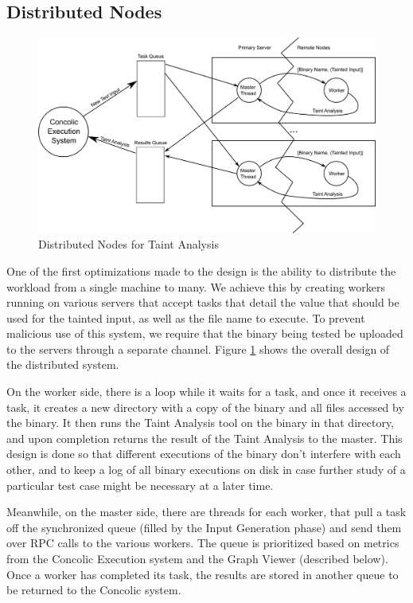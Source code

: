 \subsection{Distributed Nodes}
\begin{figure}[ht]
 \centering
 \includegraphics{distnodes}
 \caption{Distributed Nodes for Taint Analysis}
 \label{figure:distnodes}
\end{figure}

One of the first optimizations made to the design is the ability to distribute
the workload from a single machine to many. We achieve this by creating workers
running on various servers that accept tasks that detail the value that should
be used for the tainted input, as well as the file name to execute. To prevent
malicious use of this system, we require that the binary being tested be
uploaded to the servers through a separate channel. Figure
\ref{figure:distnodes} shows the overall design of the distributed system.

On the worker side, there is a loop while it waits for a task, and once it
receives a task, it creates a new directory with a copy of the binary and all
files accessed by the binary. It then runs the Taint Analysis tool on the binary
in that directory, and upon completion returns the result of the Taint Analysis
to the master. This design is done so that different executions of the binary
don't interfere with each other, and to keep a log of all binary executions on
disk in case further study of a particular test case might be necessary at a
later time.

Meanwhile, on the master side, there are threads for each worker, that pull a
task off the synchronized queue (filled by the Input Generation phase) and send
them over RPC calls to the various workers. The queue is prioritized based on
metrics from the Concolic Execution system and the Graph Viewer (described
below). Once a worker has completed its task, the results are stored in another
queue to be returned to the Concolic system.

